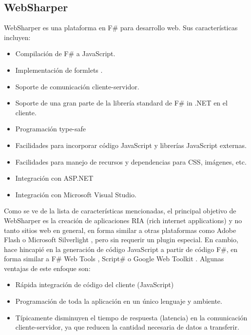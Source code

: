 \documentclass[12pt]{report}
\begin{document}
\subsection{WebSharper}

WebSharper \cite{websharper} es una plataforma en F\# para desarrollo web. Sus características incluyen: \cite{websharperdocs}

\begin{itemize}
	\item Compilación de F\# a JavaScript.
	\item Implementación de formlets \cite{CLWY08essence} \cite{CLWY08idiomsguide}.
	\item Soporte de comunicación cliente-servidor.
	\item Soporte de una gran parte de la librería standard de F\# in .NET en el cliente.
	\item Programación type-safe 
	\item Facilidades para incorporar código JavaScript y librerías JavaScript externas.
	\item Facilidades para manejo de recursos y dependencias para CSS, imágenes, etc.
	\item Integración con ASP.NET
	\item Integración con Microsoft Visual Studio.
\end{itemize}

Como se ve de la lista de características mencionadas, el principal objetivo de WebSharper es la creación de aplicaciones RIA (rich internet applications) \cite{busch2009rich} y no tanto sitios web en general, en forma similar a otras plataformas como Adobe Flash \cite{flash} o Microsoft Silverlight \cite{silverlight}, pero sin requerir un plugin especial. En cambio, hace hincapié en la generación de código JavaScript a partir de código F\#, en forma similar a F\# Web Tools \cite{petricek-client}, Script\# \cite{scriptsharp} o Google Web Toolkit \cite{gwt}. Algunas ventajas de este enfoque son:

\begin{itemize}
	\item Rápida integración de código del cliente (JavaScript)
	\item Programación de toda la aplicación en un único lenguaje y ambiente.
	\item Típicamente disminuyen el tiempo de respuesta (latencia) en la comunicación cliente-servidor, ya que reducen la cantidad necesaria de datos a transferir.
\end{itemize}
\end{document}
